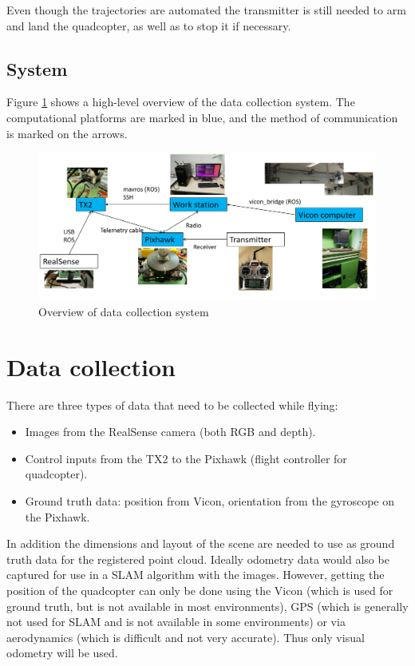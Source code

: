 \documentclass[12pt,a4paper]{article}
\begin{document}
    Even though the trajectories are automated the transmitter is still needed to arm and land the quadcopter, as well as to stop it if necessary.

  \subsection{System}
    \label{ssec: system}
    Figure \ref{f: system} shows a high-level overview of the data collection system. The computational platforms are marked in blue, and the method of communication is marked on the arrows.

      \begin{figure}[h]
        \centering
          \includegraphics[width=\textwidth]{diags/system.png}
        \caption{Overview of data collection system}
        \label{f: system}
      \end{figure}


\section{Data collection}
  \label{sec: data collection}
  There are three types of data that need to be collected while flying:
  \begin{itemize}
  \item Images from the RealSense camera (both RGB and depth).
  \item Control inputs from the TX2 to the Pixhawk (flight controller for quadcopter).
  \item Ground truth data: position from Vicon, orientation from the gyroscope on the Pixhawk.
  \end{itemize}
  In addition the dimensions and layout of the scene are needed to use as ground truth data for the registered point cloud. Ideally odometry data would also be captured for use in a SLAM algorithm with the images. However, getting the position of the quadcopter can only be done using the Vicon (which is used for ground truth, but is not available in most environments), GPS (which is generally not used for SLAM and is not available in some environments) or via aerodynamics (which is difficult and not very accurate). Thus only visual odometry will be used.
   
\end{document}
